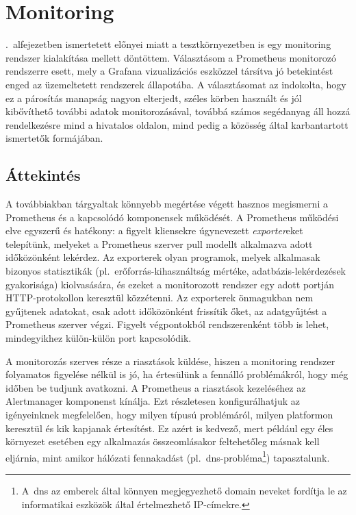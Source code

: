 
\chapter{Monitoring}
\label{chap:monitoring}
.~alfejezetben ismertetett előnyei miatt a tesztkörnyezetben is egy monitoring rendszer kialakítása mellett döntöttem. Választásom a Prometheus monitorozó rendszerre esett, mely a Grafana vizualizációs eszközzel társítva jó betekintést enged az üzemeltetett rendszerek állapotába. A választásomat az indokolta, hogy ez a párosítás manapság nagyon elterjedt, széles körben használt és jól kibővíthető további adatok monitorozásával, továbbá számos segédanyag áll hozzá rendelkezésre mind a hivatalos oldalon, mind pedig a közösség által karbantartott ismertetők formájában.

\section{Áttekintés}
A továbbiakban tárgyaltak könnyebb megértése végett hasznos megismerni a Prometheus és a kapcsolódó komponensek működését. A Prometheus működési elve egyszerű és hatékony: a figyelt kliensekre úgynevezett \textit{exporter}eket telepítünk, melyeket a Prometheus szerver pull modellt alkalmazva adott időközönként lekérdez. Az exporterek olyan programok, melyek alkalmasak bizonyos statisztikák (pl.~erőforrás-kihasználtság mértéke, adatbázis-lekérdezések gyakorisága) kiolvasására, és ezeket a monitorozott rendszer egy adott portján HTTP-protokollon keresztül közzétenni. Az exporterek önmagukban nem gyűjtenek adatokat, csak adott időközönként frissítik őket, az adatgyűjtést a Prometheus szerver végzi. Figyelt végpontokból rendszerenként több is lehet, mindegyikhez külön-külön port kapcsolódik.

A monitorozás szerves része a riasztások küldése, hiszen a monitoring rendszer folyamatos figyelése nélkül is jó, ha értesülünk a fennálló problémákról, hogy még időben be tudjunk avatkozni. A Prometheus a riasztások kezeléséhez az Alertmanager komponenst kínálja. Ezt részletesen konfigurálhatjuk az igényeinknek megfelelően, hogy milyen típusú problémáról, milyen platformon keresztül és kik kapjanak értesítést. Ez azért is kedvező, mert például egy éles környezet esetében egy alkalmazás összeomlásakor feltehetőleg másnak kell eljárnia, mint amikor hálózati fennakadást (pl.~\acrshort{dns}-probléma\footnote{A~\acrshort{dns} az emberek által könnyen megjegyezhető domain neveket fordítja le az informatikai eszközök által értelmezhető IP-címekre.}) tapasztalunk.

